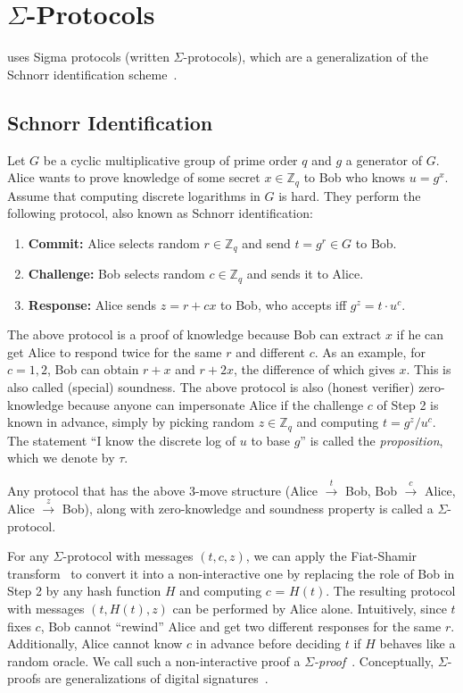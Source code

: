 \documentclass[11pt]{article}
\begin{document}


\appendix

\section{$\Sigma$-Protocols}
\label{intro:sigma}
\algname uses Sigma protocols (written $\Sigma$-protocols), which are a generalization of the Schnorr identification scheme~\cite{Sch91}. 

\subsection{Schnorr Identification}
 Let $G$ be a cyclic multiplicative group of prime order $q$ and $g$ a generator of $G$. Alice wants to prove knowledge of some secret $x\in \mathbb{Z}_q$ to Bob who knows $u = g^x$. Assume that computing discrete logarithms in $G$ is hard. They perform the following protocol, also known as Schnorr identification:

\begin{enumerate}
	\item \textbf{Commit:} Alice selects random $r\in \mathbb{Z}_q$ and send $t = g^r\in G$ to Bob.
	\item \textbf{Challenge:} Bob selects random $c\in\mathbb{Z}_q$ and sends it to Alice.
	\item \textbf{Response:} Alice sends $z = r + cx$ to Bob, who accepts iff $g^z = t\cdot u^c$.
\end{enumerate}

The above protocol is a proof of knowledge because Bob can extract $x$ if he can get Alice to respond twice for the same $r$ and different $c$. As an example, for $c = 1, 2$, Bob can obtain $r+x$ and $r+2x$, the difference of which gives $x$. This is also called (special) soundness. The above protocol is also (honest verifier) zero-knowledge because anyone can impersonate Alice if the challenge $c$ of Step 2 is known in advance, simply by picking random $z \in\mathbb{Z}_q$ and computing $t = g^z/u^c$. The statement ``I know the discrete log of $u$ to base $g$'' is called the {\em proposition}, which we denote by $\tau$.

Any protocol that has the above 3-move structure (Alice $\stackrel{t}{\rightarrow}$ Bob, Bob $\stackrel{c}{\rightarrow}$ Alice, Alice $\stackrel{z}{\rightarrow}$ Bob), along with zero-knowledge and soundness property is called a $\Sigma$-protocol. 

For any $\Sigma$-protocol with messages $(t, c, z)$, we can apply the Fiat-Shamir transform~\cite{fiatshamir} to convert it into a non-interactive one by replacing the role of Bob in Step 2 by any hash function $H$ and computing $c$ = $H(t)$. The resulting protocol with messages $(t, H(t), z)$ can be performed by Alice alone. Intuitively, since $t$ fixes $c$, Bob cannot ``rewind'' Alice and get two different responses for the same $r$. Additionally, Alice cannot know $c$ in advance before deciding $t$ if $H$ behaves like a random oracle. We call such a non-interactive proof a {\em $\Sigma$-proof}~\cite{Cra96}. Conceptually, $\Sigma$-proofs are generalizations of digital signatures~\cite{CL06}.
\end{document}

